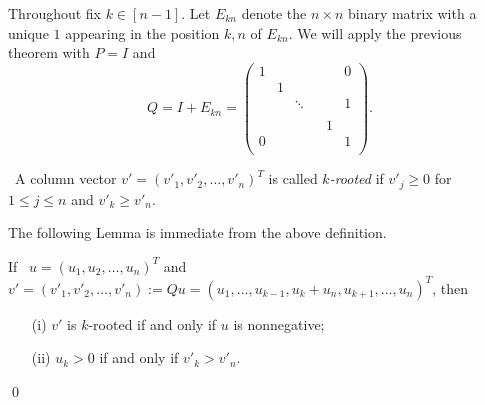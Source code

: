 \documentclass{article}
\begin{document}
 Throughout fix $k\in [n-1]$. Let $E_{kn}$ denote the $n\times n$ binary matrix with a unique $1$ appearing in the  position $k,n$ of $E_{kn}$. We will apply the previous theorem with $P=I$ and $$Q=I+E_{kn}=\begin{pmatrix}
1 &  & & &  & 0 \\
 & 1 &  &      &  &  \\
 &  & \ddots & &  & 1 \\
 &  &        & &  &  \\
  &  & & & 1 &  \\
0 &  & & &  & 1 \\
\end{pmatrix}.$$
\begin{defn}[k-rooted]
 ~A column vector $v'=(v'_1,v'_2,\ldots,v'_n)^T$ is called {\it $k$-rooted}  if $v'_{j} \geq 0$ for $1 \leq  j \leq n$ and $v'_k\geq v'_n.$
\end{defn}
\bigskip

The following Lemma is immediate from the above definition.
\bigskip

\begin{lem}
If ~$u=(u_1, u_2, \ldots, u_n)^T$ and $v'=(v'_1, v'_2, \ldots, v'_n):=Qu=(u_1,\ldots, u_{k-1},u_k+u_n, u_{k+1}, \ldots,  u_n)^T$, then
\begin{enumerate}
\item[(i)] $v'$ is $k$-rooted  if and only if  $u$ is nonnegative;
\item[(ii)] $u_k>0$ if and only if $v'_k>v'_n$.
\end{enumerate}
\qed
\end{lem}
\end{document}
